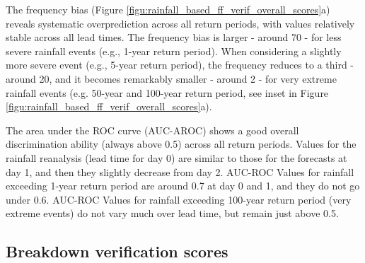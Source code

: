 The  frequency bias (Figure \ref{figu:rainfall_based_ff_verif_overall_scores}a) reveals systematic overprediction across all return periods, with values relatively stable across all lead times. The frequency bias is larger - around 70 - for less severe rainfall events (e.g., 1-year return period). When considering a slightly more severe event (e.g., 5-year return period), the frequency reduces to a third - around 20, and it becomes remarkably smaller - around 2 - for very extreme rainfall events (e.g. 50-year and 100-year return period, see inset in Figure \ref{figu:rainfall_based_ff_verif_overall_scores}a). 

The  area under the ROC curve (AUC-AROC) shows a good overall discrimination ability (always above 0.5) across all return periods. Values for the rainfall reanalysis (lead time for day 0) are similar to those for the forecasts at day 1, and then they slightly decrease from day 2. AUC-ROC Values for rainfall exceeding 1-year return period are around 0.7 at day 0 and 1, and they do not go under 0.6. AUC-ROC Values for rainfall exceeding 100-year return period (very extreme events) do not vary much over lead time, but remain just above 0.5. 


\subsection{Breakdown verification scores}

